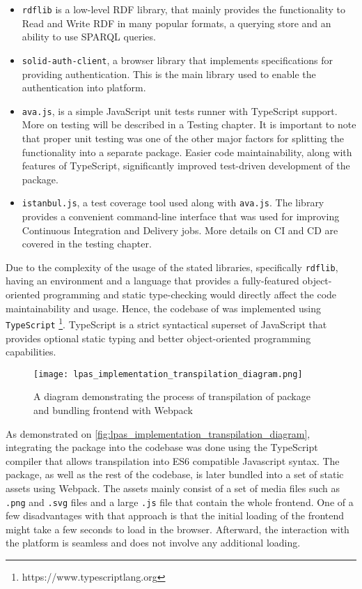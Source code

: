 \begin{itemize}
    \item \texttt{rdflib} is a low-level RDF library, that mainly provides the functionality to Read and Write RDF in many popular formats, a querying store and an ability to use SPARQL queries.
    \item \texttt{solid-auth-client}, a browser library that implements \solid{} specifications for providing authentication. This is the main library used to enable the authentication into \lpa{} platform.    
    \item \texttt{ava.js}, is a simple JavaScript unit tests runner with TypeScript support. More on testing will be described in a Testing chapter. It is important to note that proper unit testing was one of the other major factors for splitting the \solid{} functionality into a separate package. Easier code maintainability, along with features of TypeScript, significantly improved test-driven development of the package. 
    \item \texttt{istanbul.js}, a test coverage tool used along with \texttt{ava.js}. The library provides a convenient command-line interface that was used for improving Continuous Integration and Delivery jobs. More details on CI and CD are covered in the testing chapter.
\end{itemize}

Due to the complexity of the usage of the stated libraries, specifically \texttt{rdflib}, having an environment and a language that provides a fully-featured object-oriented programming and static type-checking would directly affect the code maintainability and usage. Hence, the codebase of \lpas{} was implemented using \texttt{TypeScript} \footnote{https://www.typescriptlang.org}. TypeScript is a strict syntactical superset of JavaScript that provides optional static typing and better object-oriented programming capabilities.  

\begin{figure}[h]
\centering
\texttt{[image: lpas\_implementation\_transpilation\_diagram.png]}
\caption{A diagram demonstrating the process of transpilation of \lpas{} package and bundling \lpa{} frontend with Webpack}
\label{fig:lpas_implementation_transpilation_diagram}
\end{figure}

As demonstrated on \autoref{fig:lpas_implementation_transpilation_diagram}, integrating the package into the \lpa{} codebase was done using the TypeScript compiler that allows transpilation into ES6 compatible Javascript syntax. The package, as well as the rest of the \lpa{} codebase,  is later bundled into a set of static assets using Webpack. The assets mainly consist of a set of media files such as \texttt{.png} and \texttt{.svg} files and a large \texttt{.js} file that contain the whole \lpa{} frontend. One of a few disadvantages with that approach is that the initial loading of the frontend might take a few seconds to load in the browser. Afterward, the interaction with the platform is seamless and does not involve any additional loading.

